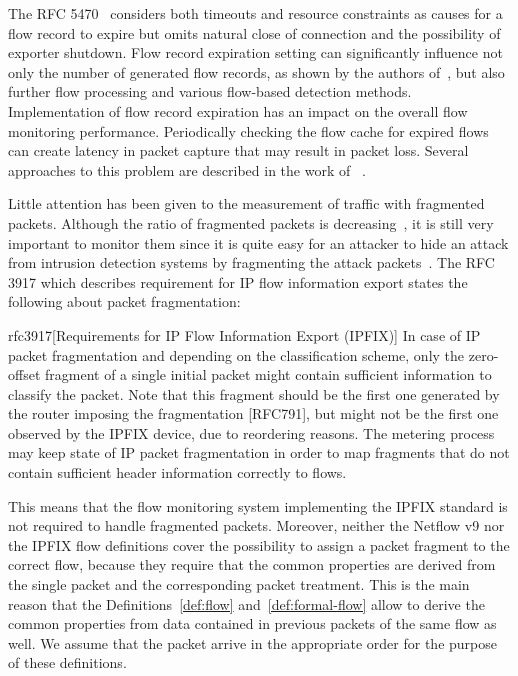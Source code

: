 The RFC 5470~\cite{rfc5470} considers both timeouts and resource constraints as causes for a flow record to expire but omits natural close of connection and the possibility of exporter shutdown. Flow record expiration setting can significantly influence not only the  number of generated flow records, as shown by the authors of~\cite{Rodriguez-2013-Empirical}, but also further flow processing and various flow-based detection methods. Implementation of flow record expiration has an impact on the overall flow monitoring performance. Periodically checking the flow cache for expired flows can create latency in packet capture that may result in packet loss. Several approaches to this problem are described in the work of \citeauthor{Molina-2006-Design}~\cite{Molina-2006-Design}.

Little attention has been given to the measurement of traffic with fragmented packets. Although the ratio of fragmented packets is decreasing~\cite{Murray-2012-State}, it is still very important to monitor them since it is quite easy for an attacker to hide an attack from intrusion detection systems by fragmenting the attack packets~\cite{Cheng-2012-Evasion}. The RFC 3917 which describes requirement for IP flow information export states the following about packet fragmentation:

\begin{displaycquote}{rfc3917}[Requirements for IP Flow Information Export (IPFIX)]
   In case of IP packet fragmentation and depending on the
   classification scheme, only the zero-offset fragment of a single
   initial packet might contain sufficient information to classify the
   packet.  Note that this fragment should be the first one generated by
   the router imposing the fragmentation [RFC791], but might not be the
   first one observed by the IPFIX device, due to reordering reasons.
   The metering process may keep state of IP packet fragmentation in
   order to map fragments that do not contain sufficient header
   information correctly to flows.
\end{displaycquote}

This means that the flow monitoring system implementing the IPFIX standard is not required to handle fragmented packets. Moreover, neither the Netflow v9 nor the IPFIX flow definitions cover the possibility to assign a packet fragment to the correct flow, because they require that the common properties are derived from the single packet and the corresponding packet treatment. This is the main reason that the Definitions~\ref{def:flow} and~\ref{def:formal-flow} allow to derive the common properties from data contained in previous packets of the same flow as well. We assume that the packet arrive in the appropriate order for the purpose of these definitions.

